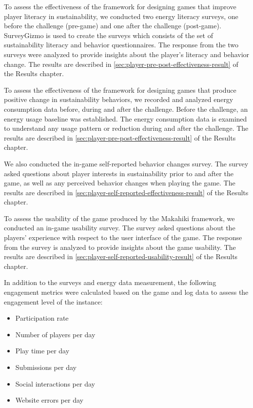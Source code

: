 To assess the effectiveness of the framework for designing games that improve player literacy in sustainability, we
conducted two energy literacy surveys, one before the challenge (pre-game) and one after
the challenge (post-game). SurveyGizmo is used to create the surveys which consists of the set of sustainability literacy and behavior questionnaires. The response from the two surveys were analyzed to provide insights about the player's literacy and behavior change. The results are described in \autoref{sec:player-pre-post-effectiveness-result} of the Results chapter.

To assess the effectiveness of the framework for designing games that produce positive change in sustainability
behaviors, we recorded and analyzed energy consumption data before, during and after the
challenge.  Before the challenge, an energy usage baseline was established. The energy consumption data is examined to understand any usage pattern or reduction during and after the challenge. The results are described in \autoref{sec:player-pre-post-effectiveness-result} of the Results chapter.

We also conducted the in-game self-reported behavior changes survey. The survey asked questions about player interests in sustainability prior to and after the game, as well as any perceived behavior changes when playing the game. The results are described in \autoref{sec:player-self-reported-effectiveness-result} of the Results chapter.

To assess the usability of the game produced by the Makahiki framework, we conducted an in-game usability survey. The survey asked questions about the players' experience with respect to the user interface of the game. The response from the survey is analyzed to provide insights about the game usability. The results are described in \autoref{sec:player-self-reported-usability-result} of the Results chapter.

In addition to the surveys and energy data measurement, the following engagement metrics were calculated based on the game and log data to assess the engagement level of the instance:

\begin{itemize}
\item Participation rate
\item Number of players per day
\item Play time per day
\item Submissions per day
\item Social interactions per day
\item Website errors per day
\end{itemize}

